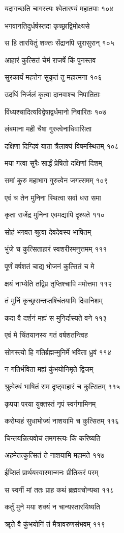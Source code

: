 यदागच्छति चागस्त्यः श्वेतारण्यं महातपाः १०४

भगवानतिदुर्धर्षस्तदा कृच्छ्राद्विमोक्ष्यसे

स हि तारयितुं शक्तः सेंद्रानपि सुरासुरान् १०५

आहारं कुत्सितं चेमं राजर्षे किं पुनस्तव

सुरकार्यं महत्तेन सुकृतं तु महात्मना १०६

उदधिं निर्जलं कृत्वा दानवाश्च निपातिताः

विंध्यश्चादित्यविद्वेषाद्वर्धमानो निवारितः १०७

लंबमाना मही चैषा गुरुत्वेनाधिवासिता

दक्षिणा दिग्दिवं याता त्रैलाक्यं विषमस्थितम् १०८

मया गत्वा सुरैः सार्द्धं प्रेषितो दक्षिणां दिशम्

समां कुरु महाभाग गुरुत्वेन जगत्समम् १०९

एवं च तेन मुनिना स्थित्वा सर्वा धरा समा

कृता राजेंद्र मुनिना एवमद्यापि दृश्यते ११०

सोहं भगवत श्रुत्वा देवदेवस्य भाषितम्

भुंजे च कुत्सिताहारं स्वशरीरमनुत्तमम् १११

पूर्णं वर्षशतं चाद्य भोजनं कुत्सितं च मे

क्षयं नाभ्येति तद्विप्र तृप्तिश्चापि ममोत्तमा ११२

तं मुनिं कृच्छ्रसन्तप्तश्चिंतयामि दिवानिशम्

कदा वै दर्शनं मह्यं स मुनिर्दास्यते वने ११३

एवं मे चिंतयानस्य गतं वर्षशतन्त्विह

सोगस्त्यो हि गतिर्ब्रह्मन्मुनिर्मे भविता ध्रुवं ११४

न गतिर्भविता मह्यं कुंभयोनिमृते द्विजम्

श्रुत्वेत्थं भाषितं राम दृष्ट्वाहारं च कुत्सितम् ११५

कृपया परया युक्तस्तं नृपं स्वर्गगामिनम्

करोम्यहं सुधाभोज्यं नाशयामि च कुत्सितम् ११६

चिन्तयन्नित्यवोचं तमगस्त्यः किं करिष्यति

अहमेतत्कुत्सितं ते नाशयामि महामते ११७

ईप्सितं प्रार्थयस्वास्मान्मनः प्रीतिकरं परम्

स स्वर्गी मां ततः प्राह कथं ब्रह्मवचोन्यथा ११८

कर्तुं मुने मया शक्यं न चान्यस्तारयिष्यति

ॠते वै कुंभयोनिं तं मैत्रावरुणसंभवम् ११९

